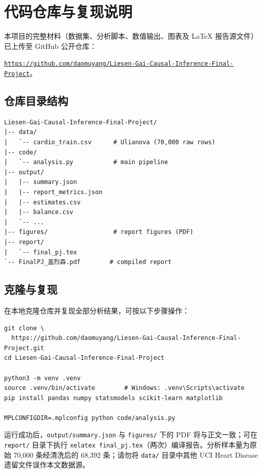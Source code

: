\documentclass[12pt,a4paper]{article}
\begin{document}
\section{代码仓库与复现说明}
\label{app:repo}

本项目的完整材料（数据集、分析脚本、数值输出、图表及 LaTeX 报告源文件）已上传至 GitHub 公开仓库：

\noindent\href{https://github.com/daomuyang/Liesen-Gai-Causal-Inference-Final-Project}{\nolinkurl{https://github.com/daomuyang/}\newline \nolinkurl{Liesen-Gai-Causal-Inference-Final-Project}}。

\subsection{仓库目录结构}

\begin{verbatim}
Liesen-Gai-Causal-Inference-Final-Project/
|-- data/
|   `-- cardio_train.csv      # Ulianova (70,000 raw rows)
|-- code/
|   `-- analysis.py           # main pipeline
|-- output/
|   |-- summary.json
|   |-- report_metrics.json
|   |-- estimates.csv
|   |-- balance.csv
|   `-- ...
|-- figures/                  # report figures (PDF)
|-- report/
|   `-- final_pj.tex
`-- FinalPJ_盖烈森.pdf        # compiled report
\end{verbatim}

\subsection{克隆与复现}

在本地克隆仓库并复现全部分析结果，可按以下步骤操作：
\begin{verbatim}
git clone \
  https://github.com/daomuyang/Liesen-Gai-Causal-Inference-Final-Project.git
cd Liesen-Gai-Causal-Inference-Final-Project

python3 -m venv .venv
source .venv/bin/activate        # Windows: .venv\Scripts\activate
pip install pandas numpy statsmodels scikit-learn matplotlib

MPLCONFIGDIR=.mplconfig python code/analysis.py
\end{verbatim}

运行成功后，\texttt{output/summary.json} 与 \texttt{figures/} 下的 PDF 将与正文一致；可在 \texttt{report/} 目录下执行 \texttt{xelatex final\_pj.tex}（两次）编译报告。分析样本量为原始 70{,}000 条经清洗后的 68{,}392 条；请勿将 \texttt{data/} 目录中其他 UCI Heart Disease 遗留文件误作本文数据源。
\end{document}
